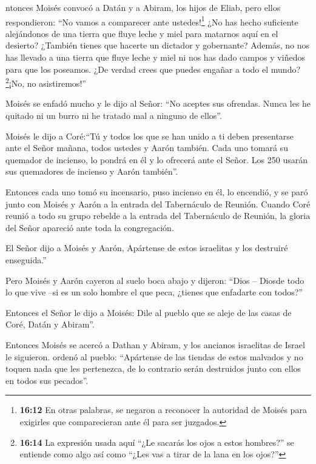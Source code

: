  ntonces Moisés convocó a Datán y a Abiram, los hijos de
Eliab, pero ellos respondieron: ``No vamos a comparecer ante
ustedes!\footnote{\textbf{16:12} En otras palabras, se negaron a
  reconocer la autoridad de Moisés para exigirles que comparecieran ante
  él para ser juzgados.}  ¿No has hecho suficiente
alejándonos de una tierra que fluye leche y miel para matarnos aquí en
el desierto? ¿También tienes que hacerte un dictador y gobernante?
 Además, no nos has llevado a una tierra que fluye leche y
miel ni nos has dado campos y viñedos para que los poseamos. ¿De verdad
crees que puedes engañar a todo el mundo?\footnote{\textbf{16:14} La
  expresión usada aquí ``¿Le sacarás los ojos a estos hombres?'' se
  entiende como algo así como ``¿Les vas a tirar de la lana en los
  ojos?''}¡No, no asistiremos!''

 Moisés se enfadó mucho y le dijo al Señor: ``No aceptes
sus ofrendas. Nunca les he quitado ni un burro ni he tratado mal a
ninguno de ellos''.

 Moisés le dijo a Coré:``Tú y todos los que se han unido a
ti deben presentarse ante el Señor mañana, todos ustedes y Aarón
también.  Cada uno tomará su quemador de incienso, lo
pondrá en él y lo ofrecerá ante el Señor. Los 250 usarán sus quemadores
de incienso y Aarón también''.

 Entonces cada uno tomó su incensario, puso incienso en él,
lo encendió, y se paró junto con Moisés y Aarón a la entrada del
Tabernáculo de Reunión.  Cuando Coré reunió a todo su grupo
rebelde a la entrada del Tabernáculo de Reunión, la gloria del Señor
apareció ante toda la congregación.

 El Señor dijo a Moisés y Aarón,  Apártense de
estos israelitas y los destruiré enseguida.''

 Pero Moisés y Aarón cayeron al suelo boca abajo y dijeron:
``Dios -- Diosde todo lo que vive --si es un solo hombre el que peca,
¿tienes que enfadarte con todos?''

 Entonces el Señor le dijo a Moisés:  Dile al
pueblo que se aleje de las casas de Coré, Datán y Abiram''.

 Entonces Moisés se acercó a Dathan y Abiram, y los
ancianos israelitas de Israel le siguieron.  ordenó al
pueblo: ``Apártense de las tiendas de estos malvados y no toquen nada
que les pertenezca, de lo contrario serán destruidos junto con ellos en
todos sus pecados''.

